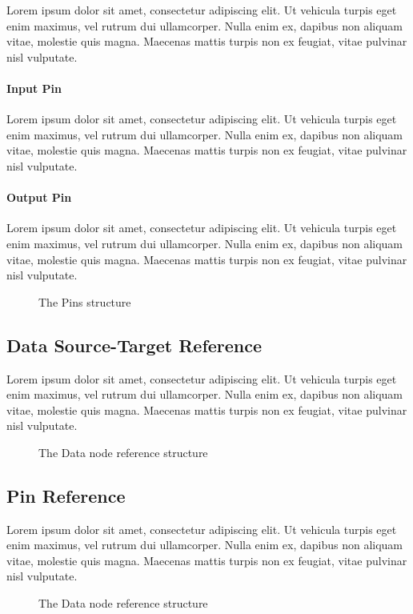 Lorem ipsum dolor sit amet, consectetur adipiscing elit. Ut vehicula turpis eget enim maximus, vel rutrum dui ullamcorper. Nulla enim ex, dapibus non aliquam vitae, molestie quis magna. Maecenas mattis turpis non ex feugiat, vitae pulvinar nisl vulputate.

\paragraph{Input Pin}

Lorem ipsum dolor sit amet, consectetur adipiscing elit. Ut vehicula turpis eget enim maximus, vel rutrum dui ullamcorper. Nulla enim ex, dapibus non aliquam vitae, molestie quis magna. Maecenas mattis turpis non ex feugiat, vitae pulvinar nisl vulputate.

\paragraph{Output Pin}

Lorem ipsum dolor sit amet, consectetur adipiscing elit. Ut vehicula turpis eget enim maximus, vel rutrum dui ullamcorper. Nulla enim ex, dapibus non aliquam vitae, molestie quis magna. Maecenas mattis turpis non ex feugiat, vitae pulvinar nisl vulputate.

\begin{figure}[!ht]
\centering

\caption{The Pins structure}
\label{fig:pins}
\end{figure}

\subsection{Data Source-Target Reference}

Lorem ipsum dolor sit amet, consectetur adipiscing elit. Ut vehicula turpis eget enim maximus, vel rutrum dui ullamcorper. Nulla enim ex, dapibus non aliquam vitae, molestie quis magna. Maecenas mattis turpis non ex feugiat, vitae pulvinar nisl vulputate.

\begin{figure}[!ht]
	\centering
	
	\caption{The Data node reference structure}
	\label{fig:data_source_target_reference}
\end{figure}

\subsection{Pin Reference}

Lorem ipsum dolor sit amet, consectetur adipiscing elit. Ut vehicula turpis eget enim maximus, vel rutrum dui ullamcorper. Nulla enim ex, dapibus non aliquam vitae, molestie quis magna. Maecenas mattis turpis non ex feugiat, vitae pulvinar nisl vulputate.

\begin{figure}[!ht]
	\centering
	
	\caption{The Data node reference structure}
	\label{fig:pin_reference}
\end{figure}
